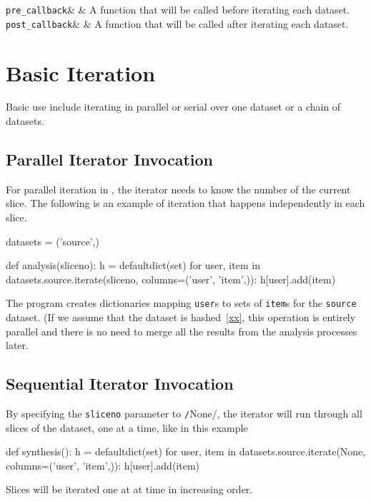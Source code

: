   \RP \texttt{pre\_callback}& \pyNone & A function that will be called before
  iterating each dataset.\\

  \RP \texttt{post\_callback}& \pyNone & A function that will be called after
  iterating each dataset.\\
\stoptable


\section{Basic Iteration}
Basic use include iterating in parallel or serial over one dataset or
a chain of datasets.

\subsection*{Parallel Iterator Invocation}
For parallel iteration in \analysis, the iterator needs to know the
number of the current slice.  The following is an example of iteration
that happens independently in each slice.

\begin{python}
datasets = ('source',)

def analysis(sliceno):
    h = defaultdict(set)
    for user, item in datasets.source.iterate(sliceno, columns=('user', 'item',)):
        h[user].add(item)
\end{python}
The program creates dictionaries mapping \texttt{user}s to sets of
\texttt{item}s for the \texttt{source} dataset.  (If we assume that
the dataset is hashed~\ref{xx}, this operation is entirely parallel
and there is no need to merge all the results from the analysis
processes later.

\subsection*{Sequential Iterator Invocation}
By specifying the \texttt{sliceno} parameter to
\texttt/None/, the iterator will run through all slices of
the dataset, one at a time, like in this example
\begin{python}
def synthesis():
    h = defaultdict(set)
    for user, item in datasets.source.iterate(None, columns=('user', 'item',)):
        h[user].add(item)
\end{python}
Slices will be iterated one at at time in increasing order.

